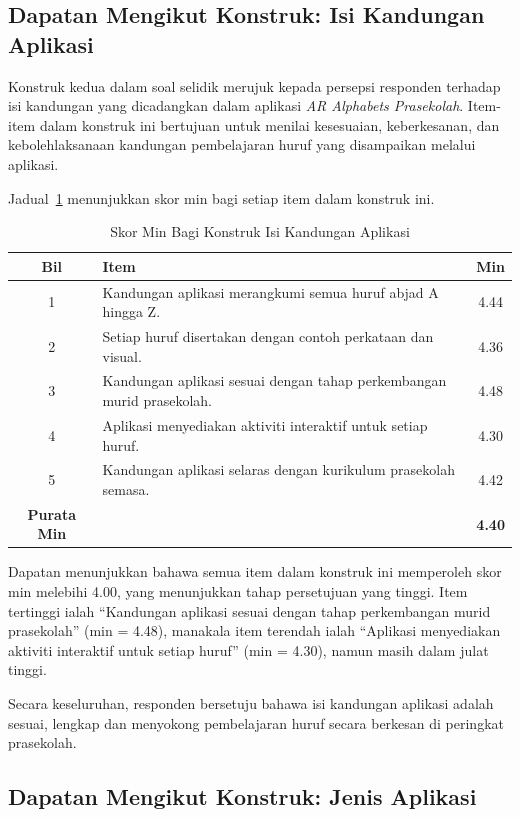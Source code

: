 {{\subsection{Dapatan Mengikut Konstruk: Isi Kandungan Aplikasi}

Konstruk kedua dalam soal selidik merujuk kepada persepsi responden terhadap isi kandungan yang dicadangkan dalam aplikasi \textit{AR Alphabets Prasekolah}. Item-item dalam konstruk ini bertujuan untuk menilai kesesuaian, keberkesanan, dan kebolehlaksanaan kandungan pembelajaran huruf yang disampaikan melalui aplikasi.

Jadual~\ref{jadual:isiKandungan} menunjukkan skor min bagi setiap item dalam konstruk ini.

\begin{table}[H]
\centering
\caption{Skor Min Bagi Konstruk Isi Kandungan Aplikasi}
\label{jadual:isiKandungan}
\begin{tabular}{|c|p{9cm}|c|}
\hline
\textbf{Bil} & \textbf{Item} & \textbf{Min} \\
\hline
1 & Kandungan aplikasi merangkumi semua huruf abjad A hingga Z. & 4.44 \\
\hline
2 & Setiap huruf disertakan dengan contoh perkataan dan visual. & 4.36 \\
\hline
3 & Kandungan aplikasi sesuai dengan tahap perkembangan murid prasekolah. & 4.48 \\
\hline
4 & Aplikasi menyediakan aktiviti interaktif untuk setiap huruf. & 4.30 \\
\hline
5 & Kandungan aplikasi selaras dengan kurikulum prasekolah semasa. & 4.42 \\
\hline
\textbf{Purata Min} & & \textbf{4.40} \\
\hline
\end{tabular}
\end{table}

Dapatan menunjukkan bahawa semua item dalam konstruk ini memperoleh skor min melebihi 4.00, yang menunjukkan tahap persetujuan yang tinggi. Item tertinggi ialah “Kandungan aplikasi sesuai dengan tahap perkembangan murid prasekolah” (min = 4.48), manakala item terendah ialah “Aplikasi menyediakan aktiviti interaktif untuk setiap huruf” (min = 4.30), namun masih dalam julat tinggi.

Secara keseluruhan, responden bersetuju bahawa isi kandungan aplikasi adalah sesuai, lengkap dan menyokong pembelajaran huruf secara berkesan di peringkat prasekolah.
\subsection{Dapatan Mengikut Konstruk: Jenis Aplikasi}

}}
